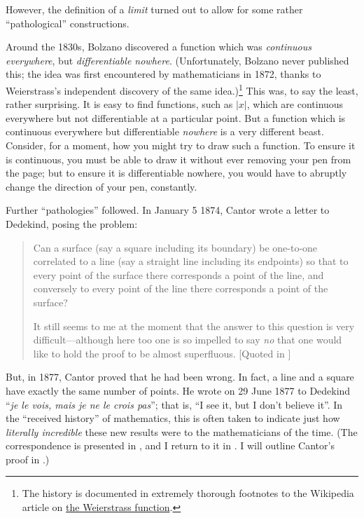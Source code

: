 \documentclass[../../../include/open-logic-section]{subfiles}
\begin{document}
However, the definition of a \emph{limit} turned out to allow for some rather ``pathological'' constructions. 

Around the 1830s, Bolzano discovered a function which was \emph{continuous everywhere}, but \emph{differentiable nowhere}. (Unfortunately, Bolzano never published this; the idea was first encountered by mathematicians in 1872, thanks to Weierstrass's independent discovery of the same idea.)\footnote{The history is documented in extremely thorough footnotes to the Wikipedia article on \href{http://en.wikipedia.org/wiki/Weierstrass_function}{the Weierstrass function}.} This was, to say the least, rather surprising. It is easy to find functions, such as $|x|$, which are continuous everywhere but not differentiable at a particular point. But a function which is continuous everywhere but differentiable \emph{nowhere} is a very different beast. Consider, for a moment, how you might try to draw such a function. To ensure it is continuous, you must be able to draw it without ever removing your pen from the page; but to ensure it is differentiable nowhere, you would have to abruptly change the direction of your pen, constantly.

Further ``pathologies'' followed. In January 5 1874, Cantor wrote a letter to Dedekind, posing the problem:
\begin{quote}
	Can a surface (say a square including its boundary) be one-to-one correlated to a line (say a straight line including its endpoints) so that to every point of the surface there corresponds a point of the line, and conversely to every point of the line there corresponds a point of the surface?
	
	It still seems to me at the moment that the answer to this question is very difficult---although here too one is so impelled to say \emph{no} that one would like to hold the proof to be almost superfluous. [Quoted in \citeauthor{Gouvea2011} \citeyear{Gouvea2011}]
\end{quote}
But, in 1877, Cantor proved that he had been wrong. In fact, a line and a square have exactly the same number of points. He wrote on 29 June 1877 to Dedekind ``\emph{je le vois, mais je ne le crois pas}''; that is, ``I see it, but I don't believe it''. In the ``received history'' of mathematics, this is often taken to indicate just how \emph{literally incredible} these new results were to the mathematicians of the time. (The correspondence is presented in \citeauthor{Gouvea2011} \citeyear{Gouvea2011}, and I return to it in . I will outline Cantor's proof in .) 
\end{document}
